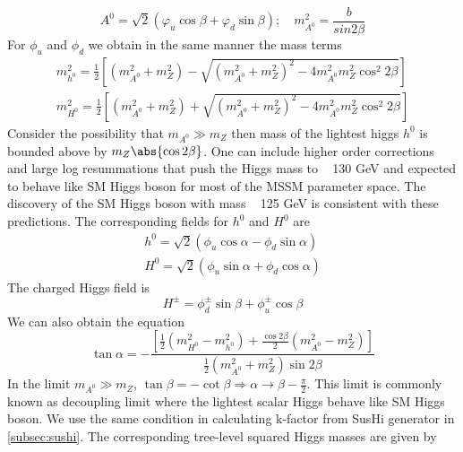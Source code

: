 \begin{equation}
A^{0} = \sqrt{2}\left(\varphi_{u} \cos\beta + \varphi_{d} \sin\beta \right); \quad m^{2}_{A^{0}} = \frac{b}{sin2\beta}
\end{equation}
For $\phi_{u}$ and $\phi_{d}$ we obtain in the same manner the mass terms
\begin{equation}\label{higgs_masses_mssm}
\begin{split}
m_{h^{0}}^{2} = \frac{1}{2}\left[ \left(m_{A^{0}}^{2} + m_{Z}^{2} \right) - \sqrt{(m_{A^{0}}^{2} + m_{Z}^{2})^{2} -4m_{A^{0}}^{2}m_{Z}^{2}\cos^{2}2\beta}\right]\\
m_{H^{0}}^{2} = \frac{1}{2}\left[ \left(m_{A^{0}}^{2} + m_{Z}^{2} \right) + \sqrt{(m_{A^{0}}^{2} + m_{Z}^{2})^{2} -4m_{A^{0}}^{2}m_{Z}^{2}\cos^{2}2\beta}\right]
\end{split}
\end{equation}
Consider the possibility that $m_{A^{0}} \gg m_{Z}$ then mass of the lightest higgs $h^{0}$ is bounded above by $m_{Z}\abs{\cos2\beta}$. One can include higher order corrections and large log resummations that push the Higgs mass to ~ 130 GeV and expected to behave like SM Higgs boson for most of the MSSM parameter space. The discovery of the SM Higgs boson with mass ~ 125 GeV is consistent with these predictions. The corresponding fields for $h^{0}$ and $H^{0}$ are
\begin{equation}
\begin{split}
h^{0} = \sqrt{2}\left(\phi_{u} \cos\alpha - \phi_{d} \sin\alpha \right)\\
H^{0} = \sqrt{2}\left(\phi_{u} \sin\alpha + \phi_{d} \cos\alpha \right)
\end{split}
\end{equation} 
The charged Higgs field is 
\begin{equation}
H^{\pm} = \phi^{\pm}_{d}\sin\beta + \phi^{\pm}_{u}\cos\beta
\end{equation}
We can also obtain the equation
\begin{equation}
\tan\alpha = -\frac{\left[\frac{1}{2}\left(m_{H^{0}}^{2} - m_{h^{0}}^{2}\right)
 + \frac{\cos2\beta}{2}\left(m_{A^{0}}^{2} - m_{Z}^{2}\right) \right]}
 {\frac{1}{2} \left( m_{A^{0}}^{2} + m_{Z}^{2} \right)\sin2\beta}
\end{equation}
In the limit $m_{A^{0}} \gg m_{Z}$, $\tan\beta = -\cot\beta \Rightarrow \alpha\rightarrow \beta - \frac{\pi}{2}$. This limit is commonly known as decoupling limit where the lightest scalar Higgs behave like SM Higgs boson. We use the same condition in calculating k-factor from SusHi generator in \ref{subsec:sushi}. The corresponding tree-level squared Higgs masses are given by \cite{Asner:2013psa}
